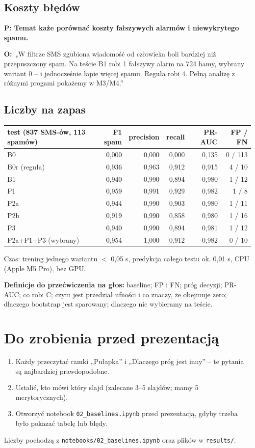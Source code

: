 \documentclass[11pt,a4paper]{article}
\newcommand{\pyt}[1]{\par\medskip\textbf{\color{spam}P: #1}\par}
\newcommand{\odp}{\textbf{O:}~}
\begin{document}
\subsection{Koszty błędów}

\pyt{Temat każe porównać koszty fałszywych alarmów i niewykrytego spamu.}
\odp „W filtrze SMS zgubiona wiadomość od człowieka boli bardziej niż przepuszczony spam. Na teście B1 robi 1 fałszywy alarm
na 724 hamy, wybrany wariant 0 -- i jednocześnie łapie więcej spamu. Reguła robi 4. Pełną analizę z różnymi progami
pokażemy w M3/M4.”

\subsection{Liczby na zapas}

\begin{center}
\small
\begin{tabular}{lrrrrr}
  \toprule
  test (837 SMS-ów, 113 spamów) & F1 spam & precision & recall & PR-AUC & FP / FN \\
  \midrule
  B0                 & 0,000 & 0,000 & 0,000 & 0,135 & 0 / 113 \\
  B0r (reguła)       & 0,936 & 0,963 & 0,912 & 0,915 & 4 / 10 \\
  B1                 & 0,940 & 0,990 & 0,894 & 0,980 & 1 / 12 \\
  P1                 & 0,959 & 0,991 & 0,929 & 0,982 & 1 / 8 \\
  P2a                & 0,944 & 0,990 & 0,903 & 0,980 & 1 / 11 \\
  P2b                & 0,919 & 0,990 & 0,858 & 0,980 & 1 / 16 \\
  P3                 & 0,940 & 0,990 & 0,894 & 0,981 & 1 / 12 \\
  P2a+P1+P3 (wybrany) & 0,954 & 1,000 & 0,912 & 0,982 & 0 / 10 \\
  \bottomrule
\end{tabular}
\end{center}

Czas: trening jednego wariantu $<$ 0,05 s, predykcja całego testu ok. 0,01 s, CPU (Apple M5 Pro), bez GPU.

\textbf{Definicje do przećwiczenia na głos:} baseline; FP i FN; próg decyzji; PR-AUC; co robi C; czym jest przedział
ufności i co znaczy, że obejmuje zero; dlaczego bootstrap jest sparowany; dlaczego nie wybieramy na teście.

\section{Do zrobienia przed prezentacją}
\begin{enumerate}
  \item Każdy przeczytać ramki „Pułapka” i „Dlaczego próg jest inny” -- te pytania są najbardziej prawdopodobne.
  \item Ustalić, kto mówi który slajd (zalecane 3--5 slajdów; mamy 5 merytorycznych).
  \item Otworzyć notebook \texttt{02\_baselines.ipynb} przed prezentacją, gdyby trzeba było pokazać tabelę lub błędy.
\end{enumerate}

\vfill
{\small\color{ink!60} Liczby pochodzą z \texttt{notebooks/02\_baselines.ipynb} oraz plików w \texttt{results/}.}
\end{document}
